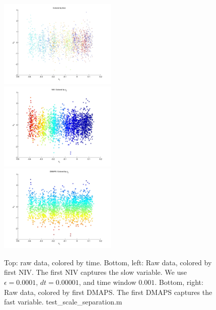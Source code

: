 \documentclass[12pt]{article}
\begin{document}
\begin{figure}
\includegraphics[width=0.5\textwidth]{raw_data} \\
\includegraphics[width=0.5\textwidth]{NIV_data}
\includegraphics[width=0.5\textwidth]{DMAPS_data}
\caption{Top: raw data, colored by time. Bottom, left: Raw data, colored by first NIV. The first NIV captures the slow variable. We use $\epsilon = 0.0001$, $dt = 0.00001$, and time window $0.001$. Bottom, right: Raw data, colored by first DMAPS. The first DMAPS captures the fast variable. test\_scale\_separation.m} 
\label{fig:1d1dexample}
\end{figure}
\end{document}
